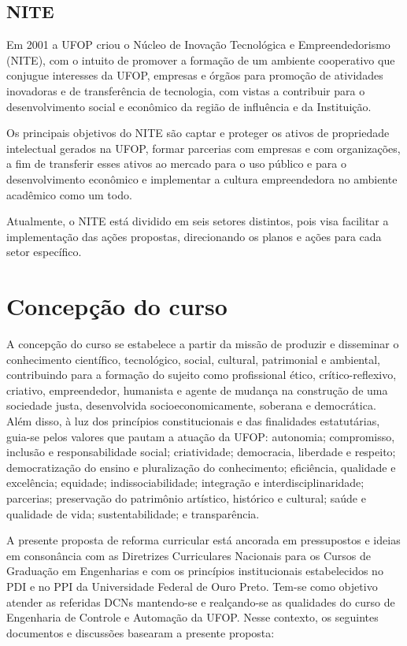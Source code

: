 \documentclass[
	12pt,				%
	openright,			%
	oneside,			%
	a4paper,			%
	english,			%
	brazil				%
	]{abntex2}
\begin{document}
\section{NITE}
Em 2001 a UFOP criou o Núcleo de Inovação Tecnológica e Empreendedorismo (NITE), com o intuito de promover a formação de um ambiente cooperativo que conjugue interesses da UFOP, empresas e órgãos para promoção de atividades inovadoras e de transferência de tecnologia, com vistas a contribuir para o desenvolvimento social e econômico da região de influência e da Instituição.

Os principais objetivos do NITE são captar e proteger os ativos de propriedade intelectual gerados na UFOP, formar parcerias com empresas e com organizações, a fim de transferir esses ativos ao mercado para o uso público e para o desenvolvimento econômico e implementar a cultura empreendedora no ambiente acadêmico como um todo.

Atualmente, o NITE está dividido em seis setores distintos, pois visa facilitar a implementação das ações propostas, direcionando os planos e ações para cada setor específico.

\chapter{Concepção do curso}
A concepção do curso se estabelece a partir da missão de produzir e disseminar o conhecimento científico, tecnológico, social, cultural, patrimonial e ambiental, contribuindo para a formação do sujeito como profissional ético, crítico-reflexivo, criativo, empreendedor, humanista e agente de mudança na construção de uma sociedade justa, desenvolvida socioeconomicamente, soberana e democrática. Além disso, à luz dos princípios constitucionais e das finalidades estatutárias, guia-se pelos valores que pautam a atuação da UFOP: autonomia; compromisso, inclusão e responsabilidade social; criatividade; democracia, liberdade e respeito; democratização do ensino e pluralização do conhecimento; eficiência, qualidade e excelência; equidade; indissociabilidade; integração e interdisciplinaridade; parcerias; preservação do patrimônio artístico, histórico e cultural; saúde e qualidade de vida; sustentabilidade; e transparência.

A presente proposta de reforma curricular está ancorada em pressupostos e ideias em consonância com as Diretrizes Curriculares Nacionais para os Cursos de Graduação em Engenharias e com os princípios institucionais estabelecidos no PDI e no PPI da Universidade Federal de Ouro Preto. Tem-se como objetivo atender as referidas DCNs mantendo-se e realçando-se as qualidades do curso de Engenharia de Controle e Automação da UFOP. Nesse contexto, os seguintes documentos e discussões basearam a presente proposta:
\end{document}
